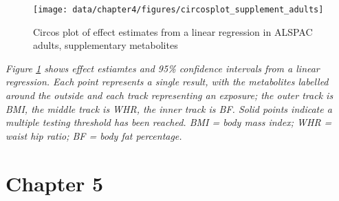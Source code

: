 \documentclass[11pt,twoside]{bristolthesis}
\newcommand{\bsmall}{\begin{small}}
\newcommand{\esmall}{\end{small}}
\begin{document}
\newpage
\begin{figure}
\texttt{[image: data/chapter4/figures/circosplot\_supplement\_adults]} \caption{Circos plot of effect estimates from a linear regression in ALSPAC adults, supplementary metabolites}\label{fig:plot-circos-supplement-adults}
\end{figure}
\noindent 
\bsmall
\emph{Figure \ref{fig:plot-circos-supplement-adults} shows effect estiamtes and 95\% confidence intervals from a linear regression. Each point represents a single result, with the metabolites labelled around the outside and each track representing an exposure; the outer track is BMI, the middle track is WHR, the inner track is BF. Solid points indicate a multiple testing threshold has been reached. BMI = body mass index; WHR = waist hip ratio; BF = body fat percentage.}
\esmall

\hypertarget{chapter5-appendix}{%
\section{Chapter 5}\label{chapter5-appendix}}
\end{document}
